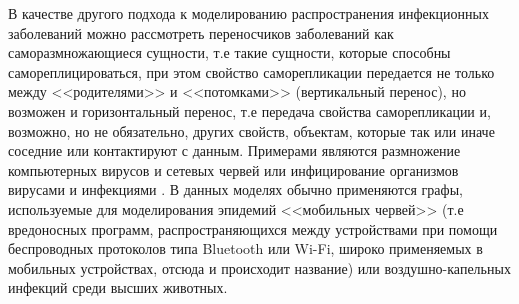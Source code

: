 В качестве другого подхода к моделированию распространения инфекционных заболеваний можно рассмотреть переносчиков заболеваний как  саморазмножающиеся сущности, т.е такие сущности, которые способны самореплицироваться, при этом свойство  саморепликации передается не только между <<родителями>> и <<потомками>> (вертикальный перенос), но возможен и горизонтальный перенос, т.е передача свойства саморепликации и, возможно, но не обязательно, других свойств, объектам, которые так или иначе соседние или контактируют с данным.  Примерами являются размножение компьютерных вирусов и сетевых червей  %
 или инфицирование организмов вирусами и инфекциями %
. 
В данных моделях обычно применяются графы, используемые для моделирования эпидемий <<мобильных червей>> (т.е вредоносных программ, распространяющихся между устройствами при помощи беспроводных протоколов типа Bluetooth или Wi-Fi, широко применяемых в мобильных устройствах, отсюда и происходит название) %
или воздушно-капельных инфекций среди высших  животных.   %
